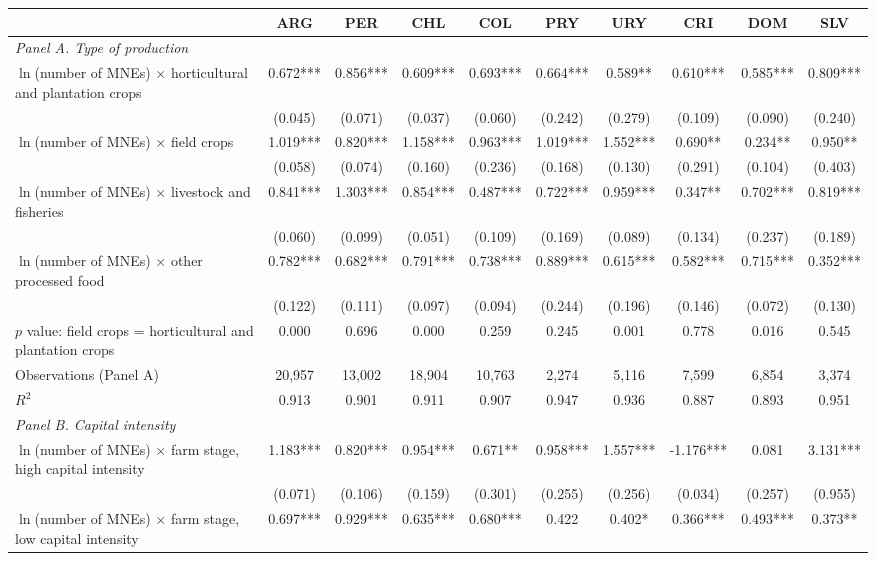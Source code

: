 \begin{tabular}{l*{9}{c}}
\toprule
 & ARG & PER & CHL & COL & PRY & URY & CRI & DOM & SLV \\
\midrule
\multicolumn{10}{l}{\textit{Panel A. Type of production}} \\
$\ln$(number of MNEs) $\times$ horticultural and plantation crops & 0.672*** & 0.856*** & 0.609*** & 0.693*** & 0.664*** & 0.589** & 0.610*** & 0.585*** & 0.809*** \\
 & (0.045) & (0.071) & (0.037) & (0.060) & (0.242) & (0.279) & (0.109) & (0.090) & (0.240) \\
$\ln$(number of MNEs) $\times$ field crops & 1.019*** & 0.820*** & 1.158*** & 0.963*** & 1.019*** & 1.552*** & 0.690** & 0.234** & 0.950** \\
 & (0.058) & (0.074) & (0.160) & (0.236) & (0.168) & (0.130) & (0.291) & (0.104) & (0.403) \\
$\ln$(number of MNEs) $\times$ livestock and fisheries & 0.841*** & 1.303*** & 0.854*** & 0.487*** & 0.722*** & 0.959*** & 0.347** & 0.702*** & 0.819*** \\
 & (0.060) & (0.099) & (0.051) & (0.109) & (0.169) & (0.089) & (0.134) & (0.237) & (0.189) \\
$\ln$(number of MNEs) $\times$ other processed food & 0.782*** & 0.682*** & 0.791*** & 0.738*** & 0.889*** & 0.615*** & 0.582*** & 0.715*** & 0.352*** \\
 & (0.122) & (0.111) & (0.097) & (0.094) & (0.244) & (0.196) & (0.146) & (0.072) & (0.130) \\
$p$ value: field crops = horticultural and plantation crops & 0.000 & 0.696 & 0.000 & 0.259 & 0.245 & 0.001 & 0.778 & 0.016 & 0.545 \\
Observations (Panel A) & 20,957 & 13,002 & 18,904 & 10,763 & 2,274 & 5,116 & 7,599 & 6,854 & 3,374 \\
$R^2$ & 0.913 & 0.901 & 0.911 & 0.907 & 0.947 & 0.936 & 0.887 & 0.893 & 0.951 \\
\midrule
\multicolumn{10}{l}{\textit{Panel B. Capital intensity}} \\
$\ln$(number of MNEs) $\times$ farm stage, high capital intensity & 1.183*** & 0.820*** & 0.954*** & 0.671** & 0.958*** & 1.557*** & -1.176*** & 0.081 & 3.131*** \\
 & (0.071) & (0.106) & (0.159) & (0.301) & (0.255) & (0.256) & (0.034) & (0.257) & (0.955) \\
$\ln$(number of MNEs) $\times$ farm stage, low capital intensity & 0.697*** & 0.929*** & 0.635*** & 0.680*** & 0.422 & 0.402* & 0.366*** & 0.493*** & 0.373** \\

\end{tabular}

